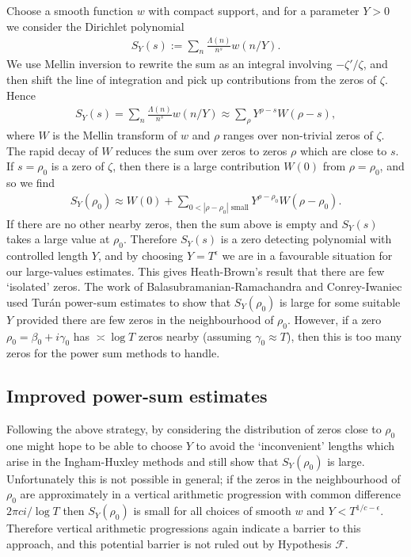 \documentclass[12pt]{amsart}
\theoremstyle{plain}
\theoremstyle{definition}
\theoremstyle{remark}
\begin{document}
Choose a smooth function $w$ with compact support, and for a parameter $Y>0$ we consider the Dirichlet polynomial
%
\begin{align*}
S_Y(s):=\sum_n \frac{\Lambda(n)}{n^{s}}w(n/Y).
\end{align*}
%
We use Mellin inversion to rewrite the sum as an integral involving $-\zeta'/\zeta$, and then shift the line of integration and pick up contributions from the zeros of $\zeta$. Hence
%
\begin{align*}
S_Y(s)=\sum_n \frac{\Lambda(n)}{n^{s}}w(n/Y) \approx \sum_{\rho} Y^{\rho - s} W(\rho - s),
\end{align*}
%
where $W$ is the Mellin transform of $w$ and $\rho$ ranges over non-trivial zeros of $\zeta$. The rapid decay of $W$ reduces the sum over zeros to zeros $\rho$ which are close to $s$. If $s=\rho_0$ is a zero of $\zeta$, then there is a large contribution $W(0)$ from $\rho=\rho_0$, and so we find
%
\begin{align}
S_Y(\rho_0)\approx W(0)+\sum_{0<|\rho-\rho_0| \text{ small}} Y^{\rho - \rho_0} W(\rho - \rho_0).\label{eq:ZeroSum}
\end{align}
%
If there are no other nearby zeros, then  the sum above is empty and $S_Y(s)$ takes a large value at $\rho_0$. Therefore $S_Y(s)$ is a zero detecting polynomial with controlled length $Y$, and by choosing $Y=T^\epsilon$ we are in a favourable situation for our large-values estimates. This gives Heath-Brown's result that there are few `isolated' zeros. The work of Balasubramanian-Ramachandra and Conrey-Iwaniec used Tur\'an power-sum estimates to show that $S_Y(\rho_0)$ is large for some suitable $Y$ provided there are few zeros in the neighbourhood of $\rho_0$. However, if a zero $\rho_0=\beta_0 + i\gamma_0$ has $\asymp \log T$ zeros nearby (assuming $\gamma_0 \approx T$), then this is too many zeros for the power sum methods to handle.
%
%
%
%
\subsection{Improved power-sum estimates}
%
%
%
%
Following the above strategy, by considering the distribution of zeros close to $\rho_0$ one might hope to be able to choose $Y$ to avoid the `inconvenient' lengths which arise in the Ingham-Huxley methods and still show that $S_Y(\rho_0)$ is large. Unfortunately this is not possible in general; if the zeros in the neighbourhood of $\rho_0$ are approximately in a vertical arithmetic progression with common difference $2\pi c i/\log{T}$ then $S_Y(\rho_0)$ is small for all choices of smooth $w$ and $Y<T^{1/c-\epsilon}$. Therefore vertical arithmetic progressions again indicate a barrier to this approach, and this potential barrier is not ruled out by Hypothesis $\mathcal{F}$.
\end{document}
